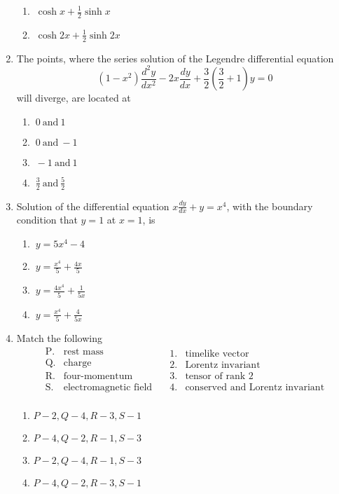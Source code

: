 \documentclass[journal]{IEEEtran}
\begin{document}
\begin{enumerate}
\begin{enumerate}
\item $\ \cosh x + \frac{1}{2}\sinh x$
\item $\ \cosh 2x + \frac{1}{2}\sinh 2x$
\end{enumerate}
\item The points, where the series solution of the Legendre differential equation
\[
(1 - x^2)\frac{d^2 y}{dx^2} - 2x\frac{dy}{dx} + \frac{3}{2}\left(\frac{3}{2}+1\right)y = 0 
\]
will diverge, are located at
\begin{enumerate}
\item $ \ 0 \ \text{and} \ 1$
\item $ \ 0 \ \text{and} \ -1$
\item $ \ -1 \ \text{and} \ 1$
\item $ \ \frac{3}{2} \ \text{and} \ \frac{5}{2} $
\end{enumerate}
\item Solution of the differential equation \( x \frac{dy}{dx} + y = x^4 \), with the boundary condition that \( y = 1 \) at \( x = 1 \), is
\begin{enumerate}
\item $ \ y = 5x^4 - 4$
\item $\ y = \frac{x^4}{5} + \frac{4x}{5} $
\item $ \ y = \frac{4x^4}{5} + \frac{1}{5x} $
\item $\ y = \frac{x^4}{5} + \frac{4}{5x} $
\end{enumerate} 
\newpage
\item Match the following \\ \[
\begin{array}{cl}
\text{P.} & \text{rest mass} \\
\text{Q.} & \text{charge} \\
\text{R.} & \text{four-momentum} \\
\text{S.} & \text{electromagnetic field} \\
\end{array}
\quad
\begin{array}{cl}
1. & \text{timelike vector} \\
2. & \text{Lorentz invariant} \\
3. & \text{tensor of rank 2} \\
4. & \text{conserved and Lorentz invariant} \\
\end{array}
\]
\begin{enumerate}
    \item $P-2,Q-4,R-3,S-1$
    \item $P-4,Q-2,R-1,S-3$
    \item $P-2,Q-4,R-1,S-3$
    \item $P-4,Q-2,R-3,S-1$
    \end{enumerate}


\end{enumerate}
\end{document}
